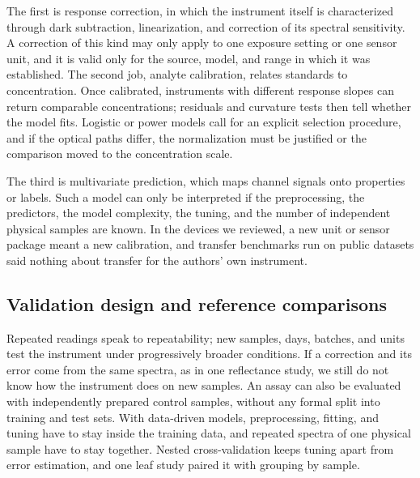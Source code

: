 The first is response correction, in which the instrument itself is characterized through dark subtraction, linearization, and correction of its spectral sensitivity. A correction of this kind may only apply to one exposure setting or one sensor unit,\citep{hotra2022investigation,troscianko2023osprad,firago2022diffuse} and it is valid only for the source, model, and range in which it was established. The second job, analyte calibration, relates standards to concentration. Once calibrated, instruments with different response slopes can return comparable concentrations; residuals and curvature tests then tell whether the model fits.\citep{prairie2020accurate} Logistic or power models call for an explicit selection procedure,\citep{long2014smartphone,nonno2022portuino} and if the optical paths differ, the normalization must be justified or the comparison moved to the concentration scale.\citep{silva2022smartphone}

The third is multivariate prediction, which maps channel signals onto properties or labels.\citep{tran2020portable,kilic2018single} Such a model can only be interpreted if the preprocessing, the predictors, the model complexity, the tuning, and the number of independent physical samples are known. In the devices we reviewed, a new unit or sensor package meant a new calibration,\citep{stevens2024low,klueppel2026environmental} and transfer benchmarks run on public datasets said nothing about transfer for the authors' own instrument.\citep{krause2021smartspectrometer}

\subsection{Validation design and reference comparisons}

Repeated readings speak to repeatability; new samples, days, batches, and units test the instrument under progressively broader conditions. If a correction and its error come from the same spectra, as in one reflectance study, we still do not know how the instrument does on new samples.\citep{perezavila2024assessment} An assay can also be evaluated with independently prepared control samples, without any formal split into training and test sets.\citep{konnel2025low} With data-driven models, preprocessing, fitting, and tuning have to stay inside the training data, and repeated spectra of one physical sample have to stay together. Nested cross-validation keeps tuning apart from error estimation,\citep{varma2006bias} and one leaf study paired it with grouping by sample.\citep{lopin2025evaluation}

